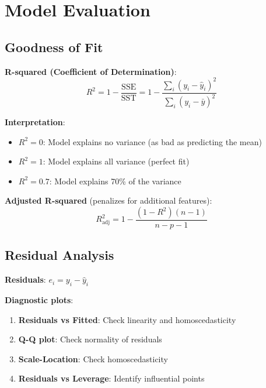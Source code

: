 \documentclass{article}
\begin{document}
\section{Model Evaluation}

\subsection{Goodness of Fit}

\textbf{R-squared (Coefficient of Determination)}:
$$R^2 = 1 - \frac{\text{SSE}}{\text{SST}} = 1 - \frac{\sum_i (y_i - \hat{y}_i)^2}{\sum_i (y_i - \bar{y})^2}$$

\textbf{Interpretation}:
\begin{itemize}
    \item $R^2 = 0$: Model explains no variance (as bad as predicting the mean)
    \item $R^2 = 1$: Model explains all variance (perfect fit)
    \item $R^2 = 0.7$: Model explains 70\% of the variance
\end{itemize}

\textbf{Adjusted R-squared} (penalizes for additional features):
$$R^2_{\text{adj}} = 1 - \frac{(1-R^2)(n-1)}{n-p-1}$$

\subsection{Residual Analysis}

\textbf{Residuals}: $e_i = y_i - \hat{y}_i$

\textbf{Diagnostic plots}:
\begin{enumerate}
    \item \textbf{Residuals vs Fitted}: Check linearity and homoscedasticity
    \item \textbf{Q-Q plot}: Check normality of residuals
    \item \textbf{Scale-Location}: Check homoscedasticity
    \item \textbf{Residuals vs Leverage}: Identify influential points
\end{enumerate}
\end{document}
